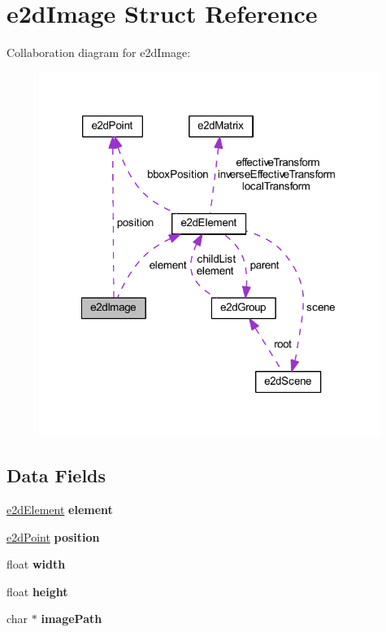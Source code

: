 \hypertarget{structe2d_image}{\section{e2d\-Image Struct Reference}
\label{structe2d_image}
}


Collaboration diagram for e2d\-Image\-:\nopagebreak
\begin{figure}[H]
\begin{center}
\leavevmode
\includegraphics[width=314pt]{structe2d_image__coll__graph}
\end{center}
\end{figure}
\subsection*{Data Fields}
\begin{DoxyCompactItemize}
\item 
\hypertarget{structe2d_image_a55bc7a3a0af41fba9e5b91f390c5928c}{\hyperlink{structe2d_element}{e2d\-Element} {\bfseries element}}\label{structe2d_image_a55bc7a3a0af41fba9e5b91f390c5928c}

\item 
\hypertarget{structe2d_image_afa8983f25fd6aa6aca18feb07d8d2249}{\hyperlink{structe2d_point}{e2d\-Point} {\bfseries position}}\label{structe2d_image_afa8983f25fd6aa6aca18feb07d8d2249}

\item 
\hypertarget{structe2d_image_ae426f00e82704fa09578f5446e22d915}{float {\bfseries width}}\label{structe2d_image_ae426f00e82704fa09578f5446e22d915}

\item 
\hypertarget{structe2d_image_a48083b65ac9a863566dc3e3fff09a5b4}{float {\bfseries height}}\label{structe2d_image_a48083b65ac9a863566dc3e3fff09a5b4}

\item 
\hypertarget{structe2d_image_afb14ab23ba86115c3b01ad4122943f89}{char $\ast$ {\bfseries image\-Path}}\label{structe2d_image_afb14ab23ba86115c3b01ad4122943f89}

\end{DoxyCompactItemize}


